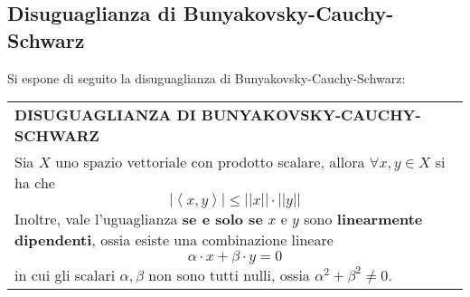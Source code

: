 \documentclass[a4paper]{extarticle}
\renewcommand\arraystretch{}
\begin{document}
\vspace{1em}
\subsection{Disuguaglianza di Bunyakovsky-Cauchy-Schwarz}
Si espone di seguito la disuguaglianza di Bunyakovsky-Cauchy-Schwarz:

\vspace{1em}
\setlength{\tabcolsep}{14pt}
\renewcommand{\arraystretch}{2}
\noindent
\begin{tabularx}{\textwidth}{@{}|P|@{}}
    \hline
    {\textbf{DISUGUAGLIANZA DI BUNYAKOVSKY-CAUCHY-SCHWARZ}}\\
    \parbox{\linewidth}{Sia $X$ uno spazio vettoriale con prodotto scalare, allora $\forall x,y \in X$ si ha che
    \[\left \vert \left<x,y\right> \right \vert \leq \left \vert \left \vert x \right \vert \right \vert \cdot \left \vert \left \vert y \right \vert \right \vert\]
    Inoltre, vale l'uguaglianza \textbf{se e solo se} $x$ e $y$ sono \textbf{linearmente dipendenti}, ossia esiste una combinazione lineare
    \[\alpha \cdot x + \beta \cdot y = 0\]
    in cui gli scalari $\alpha,\beta$ non sono tutti nulli, ossia $\alpha^2+\beta^2\neq 0$.
    \vspace{3mm}}\\
    \hline
\end{tabularx}
\end{document}
